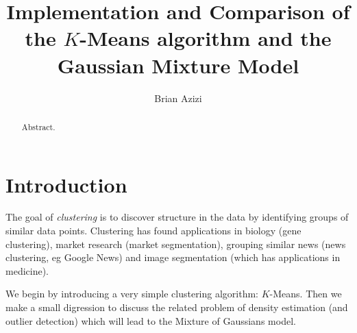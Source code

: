 \documentclass[final,3p,times,twocolumn]{elsarticle}
\begin{document}
\begin{frontmatter}



\title{Implementation and Comparison of the $K$-Means algorithm and the Gaussian Mixture Model}


\author{Brian Azizi}

\address{Cavendish Laboratory, Department of Physics, J J Thomson
  Avenue, Cambridge. CB3 0HE}

\begin{abstract}
Abstract.
\end{abstract}

\end{frontmatter}


\section{Introduction}
\label{sect:Intro}
The goal of \emph{clustering} is to discover structure in the data by identifying groups of similar data points. 
Clustering has found applications in biology (gene clustering), market research (market segmentation), grouping similar news (news clustering, eg Google News) and image segmentation (which has applications in medicine).

We begin by introducing a very simple clustering algorithm: $K$-Means. 
Then we make a small digression to discuss the related problem of density estimation (and outlier detection) which will lead to the Mixture of Gaussians model.
\end{document}
